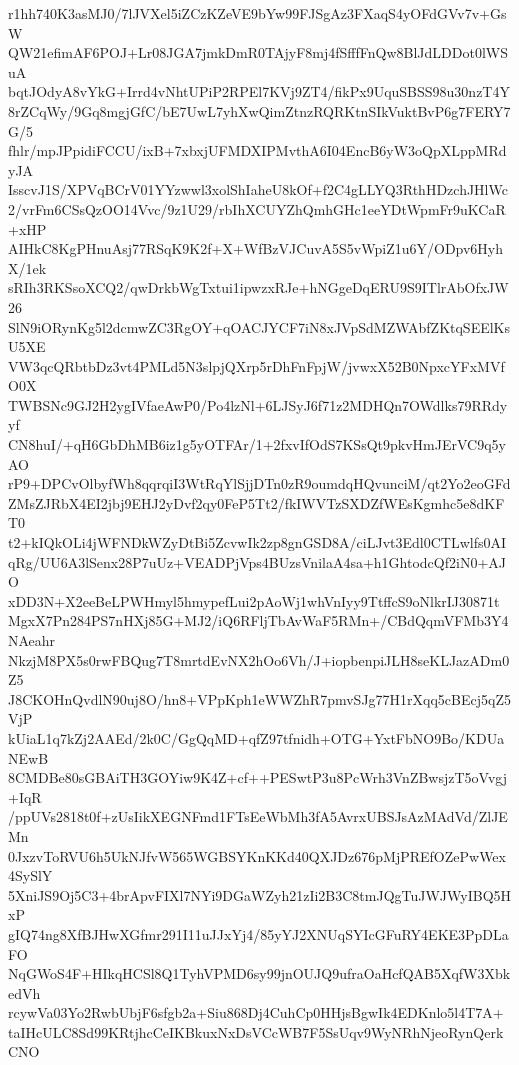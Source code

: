 r1hh740K3asMJ0/7lJVXel5iZCzKZeVE9bYw99FJSgAz3FXaqS4yOFdGVv7v+GsW
QW21efimAF6POJ+Lr08JGA7jmkDmR0TAjyF8mj4fSfffFnQw8BlJdLDDot0lWSuA
bqtJOdyA8vYkG+Irrd4vNhtUPiP2RPEl7KVj9ZT4/fikPx9UquSBSS98u30nzT4Y
8rZCqWy/9Gq8mgjGfC/bE7UwL7yhXwQimZtnzRQRKtnSIkVuktBvP6g7FERY7G/5
fhlr/mpJPpidiFCCU/ixB+7xbxjUFMDXIPMvthA6I04EncB6yW3oQpXLppMRdyJA
IsscvJ1S/XPVqBCrV01YYzwwl3xolShIaheU8kOf+f2C4gLLYQ3RthHDzchJHlWc
2/vrFm6CSsQzOO14Vvc/9z1U29/rbIhXCUYZhQmhGHc1eeYDtWpmFr9uKCaR+xHP
AIHkC8KgPHnuAsj77RSqK9K2f+X+WfBzVJCuvA5S5vWpiZ1u6Y/ODpv6HyhX/1ek
sRIh3RKSsoXCQ2/qwDrkbWgTxtui1ipwzxRJe+hNGgeDqERU9S9ITlrAbOfxJW26
SlN9iORynKg5l2dcmwZC3RgOY+qOACJYCF7iN8xJVpSdMZWAbfZKtqSEElKsU5XE
VW3qcQRbtbDz3vt4PMLd5N3slpjQXrp5rDhFnFpjW/jvwxX52B0NpxcYFxMVfO0X
TWBSNc9GJ2H2ygIVfaeAwP0/Po4lzNl+6LJSyJ6f71z2MDHQn7OWdlks79RRdyyf
CN8huI/+qH6GbDhMB6iz1g5yOTFAr/1+2fxvIfOdS7KSsQt9pkvHmJErVC9q5yAO
rP9+DPCvOlbyfWh8qqrqiI3WtRqYlSjjDTn0zR9oumdqHQvunciM/qt2Yo2eoGFd
ZMsZJRbX4EI2jbj9EHJ2yDvf2qy0FeP5Tt2/fkIWVTzSXDZfWEsKgmhc5e8dKFT0
t2+kIQkOLi4jWFNDkWZyDtBi5ZcvwIk2zp8gnGSD8A/ciLJvt3Edl0CTLwlfs0AI
qRg/UU6A3lSenx28P7uUz+VEADPjVps4BUzsVnilaA4sa+h1GhtodcQf2iN0+AJO
xDD3N+X2eeBeLPWHmyl5hmypefLui2pAoWj1whVnIyy9TtffcS9oNlkrIJ30871t
MgxX7Pn284PS7nHXj85G+MJ2/iQ6RFljTbAvWaF5RMn+/CBdQqmVFMb3Y4NAeahr
NkzjM8PX5s0rwFBQug7T8mrtdEvNX2hOo6Vh/J+iopbenpiJLH8seKLJazADm0Z5
J8CKOHnQvdlN90uj8O/hn8+VPpKph1eWWZhR7pmvSJg77H1rXqq5cBEcj5qZ5VjP
kUiaL1q7kZj2AAEd/2k0C/GgQqMD+qfZ97tfnidh+OTG+YxtFbNO9Bo/KDUaNEwB
8CMDBe80sGBAiTH3GOYiw9K4Z+cf++PESwtP3u8PcWrh3VnZBwsjzT5oVvgj+IqR
/ppUVs2818t0f+zUsIikXEGNFmd1FTsEeWbMh3fA5AvrxUBSJsAzMAdVd/ZlJEMn
0JxzvToRVU6h5UkNJfvW565WGBSYKnKKd40QXJDz676pMjPREfOZePwWex4SySlY
5XniJS9Oj5C3+4brApvFIXl7NYi9DGaWZyh21zIi2B3C8tmJQgTuJWJWyIBQ5HxP
gIQ74ng8XfBJHwXGfmr291I11uJJxYj4/85yYJ2XNUqSYIcGFuRY4EKE3PpDLaFO
NqGWoS4F+HIkqHCSl8Q1TyhVPMD6sy99jnOUJQ9ufraOaHcfQAB5XqfW3XbkedVh
rcywVa03Yo2RwbUbjF6sfgb2a+Siu868Dj4CuhCp0HHjsBgwIk4EDKnlo5l4T7A+
taIHcULC8Sd99KRtjhcCeIKBkuxNxDsVCcWB7F5SsUqv9WyNRhNjeoRynQerkCNO
